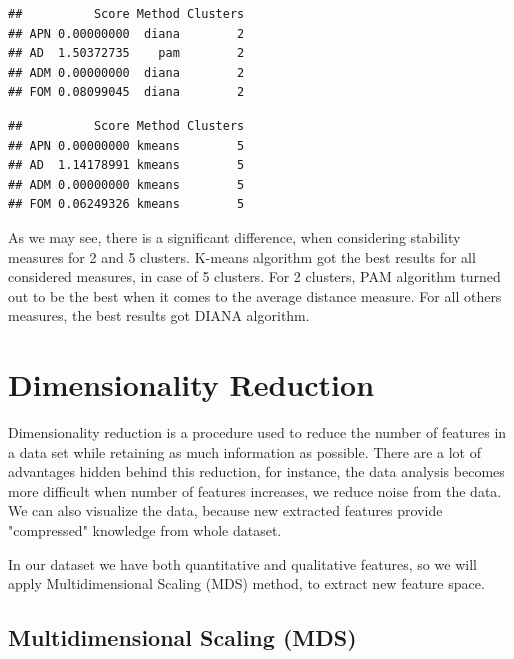 \documentclass[11pt,a4paper]{article}\usepackage[]{graphicx}\usepackage[]{xcolor}
\makeatletter
\newenvironment{kframe}{%
 \def\at@end@of@kframe{}%
 \ifinner\ifhmode%
  \def\at@end@of@kframe{\end{minipage}}%
  \begin{minipage}{\columnwidth}%
 \fi\fi%
 \def\FrameCommand##1{\hskip\@totalleftmargin \hskip-\fboxsep
 \colorbox{shadecolor}{##1}\hskip-\fboxsep
     \hskip-\linewidth \hskip-\@totalleftmargin \hskip\columnwidth}%
 \MakeFramed {\advance\hsize-\width
   \@totalleftmargin\z@ \linewidth\hsize
   \@setminipage}}%
 {\par\unskip\endMakeFramed%
 \at@end@of@kframe}
\newenvironment{knitrout}{}{} %
\makeatother
\begin{document}
\begin{knitrout}
\color{fgcolor}\begin{kframe}
\begin{verbatim}
##          Score Method Clusters
## APN 0.00000000  diana        2
## AD  1.50372735    pam        2
## ADM 0.00000000  diana        2
## FOM 0.08099045  diana        2
\end{verbatim}
\end{kframe}
\end{knitrout}
	
\begin{knitrout}
\color{fgcolor}\begin{kframe}
\begin{verbatim}
##          Score Method Clusters
## APN 0.00000000 kmeans        5
## AD  1.14178991 kmeans        5
## ADM 0.00000000 kmeans        5
## FOM 0.06249326 kmeans        5
\end{verbatim}
\end{kframe}
\end{knitrout}
	
	As we may see, there is a significant difference, when considering stability measures for 2 and 5 clusters. K-means algorithm got the best results for all considered measures, in case of 5 clusters. For 2 clusters, PAM algorithm turned out to be the best when it comes to the average distance measure. For all others measures, the best results got DIANA algorithm.
	
	\section{Dimensionality Reduction}
	
	Dimensionality reduction is a procedure used to reduce the number of features in a data set while retaining as much information as possible. There are a lot of advantages hidden behind this reduction, for instance, the data analysis becomes more difficult when number of features increases, we reduce noise from the data. We can also visualize the data, because new extracted features provide "compressed" knowledge from whole dataset.
	
	In our dataset we have both quantitative and qualitative features, so we will apply Multidimensional Scaling (MDS) method, to extract new feature space.
	
	\subsection{Multidimensional Scaling (MDS)}
	
\end{document}
